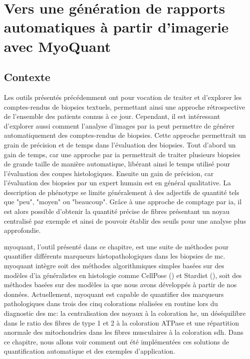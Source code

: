 \chapter{Vers une génération de rapports automatiques à partir d’imagerie avec MyoQuant}
\section{Contexte}
Les outils présentés précédemment ont pour vocation de traiter et d'explorer les comptes-rendus de biopsies textuels, permettant ainsi une approche rétrospective de l'ensemble des patients connus à ce jour. Cependant, il est intéressant d'explorer aussi comment l'analyse d'images par \gls{ia} peut permettre de générer automatiquement des comptes-rendus de biopsies. Cette approche permettrait un grain de précision et de temps dans l'évaluation des biopsies. Tout d'abord un gain de temps, car une approche par \gls{ia} permettrait de traiter  plusieurs biopsies de grande taille de manière automatique, libérant ainsi le temps utilisé pour l'évaluation des coupes histologiques. Ensuite un gain de précision, car l'évaluation des biopsies par un expert humain est en général qualitative. La description de phénotype se limite généralement à des adjectifs de quantité tels que "peu", "moyen" ou "beaucoup". Grâce à une approche de comptage par \gls{ia}, il est alors possible d'obtenir la quantité précise de fibres présentant un noyau centralisé par exemple et ainsi de pouvoir établir des seuils pour une analyse plus approfondie.

\gls{myoquant}, l'outil présenté dans ce chapitre, est une suite de méthodes pour quantifier différents marqueurs histopathologiques dans les biopsies de \gls{mc}. \gls{myoquant} intègre soit des méthodes algorithmiques simples basées sur des modèles d'\gls{ia} généralistes en histologie comme CellPose (\cite{stringer_cellpose_2021}) et Stardist (\cite{weigert_star-convex_2020}), soit des méthodes basées sur des modèles \gls{ia} que nous avons développés à partir de nos données. Actuellement, \gls{myoquant} est capable de quantifier des marqueurs pathologiques dans trois des cinq colorations réalisées en routine lors du diagnostic des \gls{mc}: la centralisation des noyaux à la coloration \gls{he}, un déséquilibre dans le ratio des fibres de type 1 et 2 à la coloration ATPase et une répartition anormale des mitochondries dans les fibres musculaires à la coloration \gls{sdh}. Dans ce chapitre, nous allons voir comment ont été implémentées ces solutions de quantification automatique et des exemples d'application.

